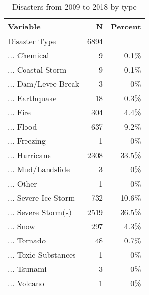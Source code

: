\begin{table}[!htbp] \centering \renewcommand*{\arraystretch}{1.1}\caption{Disasters from 2009 to 2018 by type}\label{DisasterTypes}
\begin{tabular}{lrr}
\hline
\hline
Variable & N & Percent \\ 
\hline
Disaster Type & 6894 &  \\ 
... Chemical & 9 & 0.1\% \\ 
... Coastal Storm & 9 & 0.1\% \\ 
... Dam/Levee Break & 3 & 0\% \\ 
... Earthquake & 18 & 0.3\% \\ 
... Fire & 304 & 4.4\% \\ 
... Flood & 637 & 9.2\% \\ 
... Freezing & 1 & 0\% \\ 
... Hurricane & 2308 & 33.5\% \\ 
... Mud/Landslide & 3 & 0\% \\ 
... Other & 1 & 0\% \\ 
... Severe Ice Storm & 732 & 10.6\% \\ 
... Severe Storm(s) & 2519 & 36.5\% \\ 
... Snow & 297 & 4.3\% \\ 
... Tornado & 48 & 0.7\% \\ 
... Toxic Substances & 1 & 0\% \\ 
... Tsunami & 3 & 0\% \\ 
... Volcano & 1 & 0\%\\ 
\hline
\hline
\end{tabular}
\end{table}

